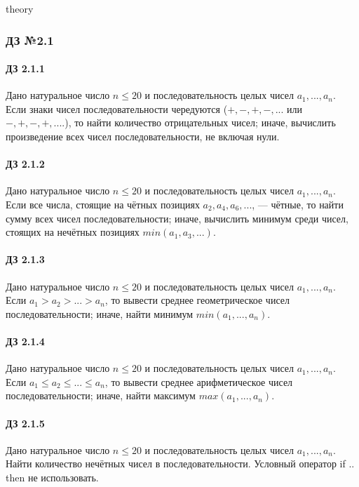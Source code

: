 \documentclass[12pt,a4paper]{report}
\begin{document}
\parindent=1cm
\pagestyle{empty}

\lstset{ language=Pascal, basicstyle=\small\ttfamily, numbers=left, numberstyle=\tiny, stepnumber=1, numbersep=5pt, extendedchars=\true, showstringspaces=false, breakatwhitespace=true, frame=single, keepspaces=true }
\clearpage
theory

\clearpage
\clearpage
\subsubsection*{ДЗ №2.1}
\paragraph*{ДЗ 2.1.1} Дано натуральное число $n \le 20$ и последовательность целых чисел $a_1, ..., a_n$. Если знаки чисел последовательности чередуются ($+,-,+,-, ...$ или $-,+,-,+, ....$), то найти количество отрицательных чисел; иначе, вычислить произведение всех чисел последовательности, не включая нули.
\paragraph*{ДЗ 2.1.2} Дано натуральное число $n \le 20$ и последовательность целых чисел $a_1, ..., a_n$. Если все числа, стоящие на чётных позициях $a_2, a_4, a_6, ...$, --- чётные, то найти сумму всех чисел последовательности; иначе, вычислить минимум среди чисел, стоящих на нечётных позициях $min(a_1, a_3, ...)$.
\paragraph*{ДЗ 2.1.3} Дано натуральное число $n \le 20$ и последовательность целых чисел $a_1, ..., a_n$. Если $a_1 > a_2 > ... > a_n$, то вывести среднее геометрическое чисел последовательности; иначе, найти минимум $min(a_1, ..., a_n)$.
\paragraph*{ДЗ 2.1.4} Дано натуральное число $n \le 20$ и последовательность целых чисел $a_1, ..., a_n$. Если $a_1 \le a_2 \le ... \le a_n$, то вывести среднее арифметическое чисел последовательности; иначе, найти максимум $max(a_1, ..., a_n)$.
\paragraph*{ДЗ 2.1.5} Дано натуральное число $n \le 20$ и последовательность целых чисел $a_1, ..., a_n$. Найти количество нечётных чисел в последовательности. Условный оператор if .. then не использовать.
\end{document}
